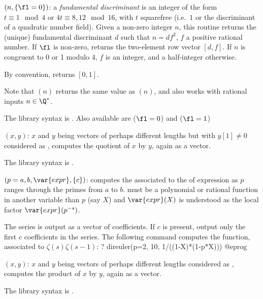 $(n,\{\fl=0\})$: \label{se:coredisc}a \emph{fundamental discriminant} is an integer of the form $t\equiv 1
\mod 4$ or $4t \equiv 8,12 \mod 16$, with $t$ squarefree (i.e.~$1$ or the
discriminant of a quadratic number field). Given a non-zero integer
$n$, this routine returns the (unique) fundamental discriminant $d$
such that $n=df^2$, $f$ a positive rational number. If $\fl$ is non-zero,
returns the two-element row vector $[d,f]$. If $n$ is congruent to
0 or 1 modulo 4, $f$ is an integer, and a half-integer otherwise.

By convention,  returns $[0,1]$.

Note that $(n)$ returns the same value as $(n)$,
and also works with rational inputs $n\in\Q^*$.

The library syntax is .
Also available are  ($\fl = 0$) and
 ($\fl = 1$)

$(x,y)$: \label{se:dirdiv}$x$ and $y$ being vectors of perhaps different
lengths but with $y[1]\neq 0$ considered as , computes
the quotient of $x$ by $y$, again as a vector.

The library syntax is .

$(p=a,b,\var{expr},\{c\})$: \label{se:direuler}computes the  associated to the  of expression  as $p$ ranges through the primes from $a$
to $b$.  must be a polynomial or rational function in another
variable than $p$ (say $X$) and $\var{expr}(X)$ is understood as the local
factor $\var{expr}(p^{-s})$.

The series is output as a vector of coefficients. If $c$ is present, output
only the first $c$ coefficients in the series. The following command computes
the  function, associated to $\zeta(s)\zeta(s-1)$:
\bprog
? direuler(p=2, 10, 1/((1-X)*(1-p*X)))
@eprog


$(x,y)$: \label{se:dirmul}$x$ and $y$ being vectors of perhaps different lengths considered as
, computes the product of $x$ by $y$, again as a vector.

The library syntax is .

